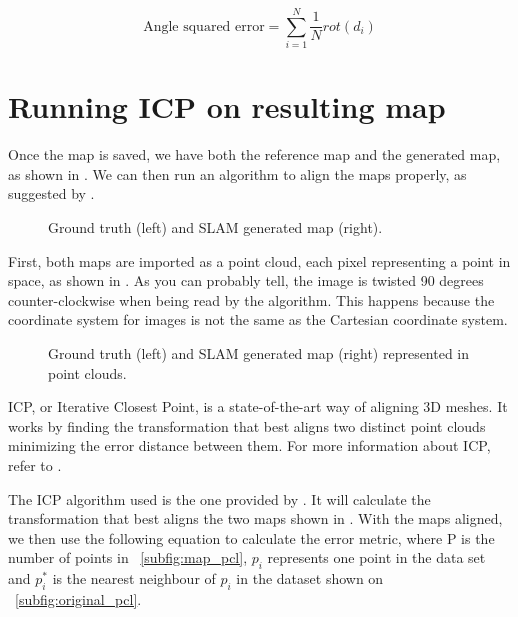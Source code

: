 \begin{equation}
\text{Angle squared error} = \sum_{i=1}^N \frac{1}{N} rot(d_i)
\end{equation}

\section{Running ICP on resulting map}

Once the map is saved, we have both the reference map and the generated map, as shown in . We can then run an algorithm to align the maps properly, as suggested by \citeauthor{santos2013evaluation}.

\begin{figure}[!ht]
     \centering
     \hspace{2cm}
     \caption{Ground truth (left) and SLAM generated map (right).}
     \label{fig:reference_map_icp}
\end{figure}

First, both maps are imported as a point cloud, each pixel representing a point in space, as shown in . As you can probably tell, the image is twisted 90 degrees counter-clockwise when being read by the algorithm. This happens because the coordinate system for images is not the same as the Cartesian coordinate system.

\begin{figure}[!ht]
     \centering
     \hspace{0cm}
     \caption{Ground truth (left) and SLAM generated map (right) represented in point clouds.}
     \label{fig:point_cloud}
\end{figure}

ICP, or Iterative Closest Point, is a state-of-the-art way of aligning 3D meshes. It works by finding the transformation that best aligns two distinct point clouds minimizing the error distance between them. For more information about ICP, refer to \citeauthor{besl1992method}.

The ICP algorithm used is the one provided by \citeauthor{flannigan2019}. It will calculate the transformation that best aligns the two maps shown in . With the maps aligned, we then use the following equation to calculate the error metric, where P is the number of points in \figurename~\ref{subfig:map_pcl}, $p_i$ represents one point in the data set and $p_i^*$ is the nearest neighbour of $p_i$ in the dataset shown on \figurename~\ref{subfig:original_pcl}.

